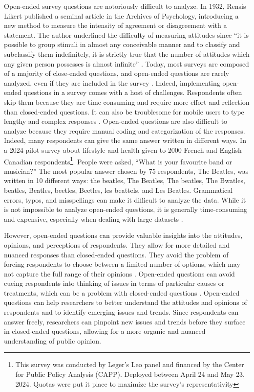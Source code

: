 \documentclass[
  authoryear,
  preprint,
  3p]{elsarticle}
\begin{document}
Open-ended survey questions are notoriously difficult to analyze. In
1932, Rensis Likert published a seminal article in the Archives of
Psychology, introducing a new method to measure the intensity of
agreement or disagreement with a statement. The author underlined the
difficulty of measuring attitudes since ``it is possible to group
stimuli in almost any conceivable manner and to classify and subclassify
them indefinitely, it is strictly true that the number of attitudes
which any given person possesses is almost infinite'' \citep{likert32}.
Today, most surveys are composed of a majority of close-ended questions,
and open-ended questions are rarely analyzed, even if they are included
in the survey \citep{roberts_etal14}. Indeed, implementing open-ended
questions in a survey comes with a host of challenges. Respondents often
skip them because they are time-consuming and require more effort and
reflection than closed-ended questions. It can also be troublesome for
mobile users to type lengthy and complex responses
\citep{dillman_etal14}. Open-ended questions are also difficult to
analyze because they require manual coding and categorization of the
responses. Indeed, many respondents can give the same answer written in
different ways. In a 2024 pilot survey about lifestyle and health given
to 2000 French and English Canadian respondents\footnote{This survey was
  conducted by Leger's Leo panel and financed by the Center for Public
  Policy Analysis (CAPP). Deployed between April 24 and May 23, 2024.
  Quotas were put it place to maximize the survey's representativity}.
People were asked, ``What is your favourite band or musician?'' The most
popular answer chosen by 75 respondents, The Beatles, was written in 10
different ways: the beatles, The Beatles, The beatles, The Bwatles,
beatles, Beatles, beetles, Beetles, les beattels, and Les Beatles.
Grammatical errors, typos, and misspellings can make it difficult to
analyze the data. While it is not impossible to analyze open-ended
questions, it is generally time-consuming and expensive, especially when
dealing with large datasets
\citep{dillman_etal14, bradburn_etal04, roberts_etal14, schuman_presser96}.

However, open-ended questions can provide valuable insights into the
attitudes, opinions, and perceptions of respondents. They allow for more
detailed and nuanced responses than closed-ended questions. They avoid
the problem of forcing respondents to choose between a limited number of
options, which may not capture the full range of their opinions
\citep{dillman_etal14}. Open-ended questions can avoid cueing
respondents into thinking of issues in terms of particular causes or
treatments, which can be a problem with closed-ended questions
\citep{roberts_etal14, iyengar96}. Open-ended questions can help
researchers to better understand the attitudes and opinions of
respondents and to identify emerging issues and trends. Since
respondents can answer freely, researchers can pinpoint new issues and
trends before they surface in closed-ended questions, allowing for a
more organic and nuanced understanding of public opinion.
\end{document}
